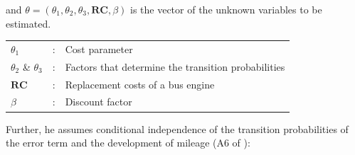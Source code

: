 \documentclass[a4paper,12pt,bold]{scrartcl}
\begin{document}
and $\theta = \left(\theta_1, \theta_2, \theta_3, \mathbf{RC}, \beta \right)$ is the vector of the unknown variables to be estimated.



\begin{table}[htbp]
    \centering %
    \begin{tabular}{l c p{10cm} }
        $\theta_1$ & : & Cost parameter\\
        $\theta_2$ \& $\theta_3$ & : & Factors that determine the transition probabilities\\
        $\mathbf{RC}$ & : & Replacement costs of a bus engine\\
        $\beta$ & : & Discount factor\\
    \end{tabular}
\end{table}

Further, he assumes conditional independence of the transition probabilities of the error term and the development of mileage (A6 of \cite{Rust.1988}):
\end{document}
